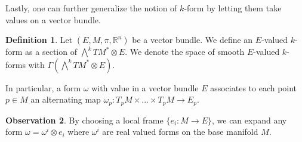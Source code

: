 \documentclass[12pt,a4paper]{report}
\theoremstyle{definition}
\newtheorem{Def}{Definition}[chapter]
\theoremstyle{Theorem}
\theoremstyle{definition}
\theoremstyle{definition}
\newtheorem{Obs}[Def]{Observation}
\begin{document}
	Lastly, one can further generalize the notion of $k$-form by letting them take values on a vector bundle.
	\begin{Def}
		Let $(E,M,\pi, \mathbb{R}^n)$ be a vector bundle. We define an $E$-valued $k$-form as a section of $\bigwedge^kTM^*\otimes E$. We denote the space of smooth $E$-valued $k$-forms with $\Gamma(\bigwedge^kTM^*\otimes E)$.
	\end{Def}
	In particular, a form $\omega$ with value in a vector bundle $E$ associates to each point $p\in M$ an alternating map $\omega_p:T_pM\times...\times T_pM\rightarrow E_p$.
	\begin{Obs}
		By choosing a local frame $\{e_i:M\rightarrow E\}$, we can expand any form $\omega=\omega^i\otimes e_i$ where $\omega^i$ are real valued forms on the base manifold $M$.
	\end{Obs}
\end{document}
